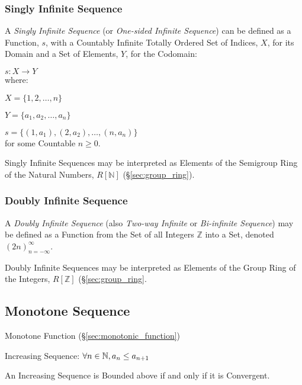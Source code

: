 \subsubsection{Singly Infinite Sequence}\label{sec:singly_infinite}

A \emph{Singly Infinite Sequence} (or \emph{One-sided Infinite
  Sequence}) can be defined as a Function, $s$, with a Countably
Infinite Totally Ordered Set of Indices, $X$, for its Domain and a Set
of Elements, $Y$, for the Codomain:

  $s : X \rightarrow Y$ \\
where:

  $X = \{1,2,\ldots,n\}$

  $Y = \{a_1, a_2,\ldots,a_n\}$

  $s = \{(1,a_1), (2,a_2),\ldots, (n,a_n)\}$ \\
for some Countable $n \geq 0$.

Singly Infinite Sequences may be interpreted as Elements of the
Semigroup Ring of the Natural Numbers, $R[\mathbb{N}]$
(\S\ref{sec:group_ring}).



\subsubsection{Doubly Infinite Sequence}\label{sec:doubly_infinite}

A \emph{Doubly Infinite Sequence} (also \emph{Two-way Infinite} or
\emph{Bi-infinite Sequence}) may be defined as a Function from the Set
of all Integers $\mathbb{Z}$ into a Set, denoted
$(2n)^{\infty}_{n=-\infty}$.

Doubly Infinite Sequences may be interpreted as Elements of the Group
Ring of the Integers, $R[\mathbb{Z}]$ (\S\ref{sec:group_ring}.



\subsection{Monotone Sequence}\label{sec:monotone_sequence}

Monotone Function (\S\ref{sec:monotonic_function})

Increasing Sequence: $\forall n \in \mathbb{N}, a_n \leq a_{n+1}$

An Increasing Sequence is Bounded above if and only if it is
Convergent.

